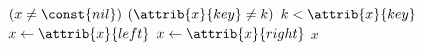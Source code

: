 \begin{codebox}
\li \While $(x \neq \const{nil})$ \Or $(\attrib{x}{key} \neq k)$
\li \Do
		\If $k < \attrib{x}{key}$
\li 	\Then
			$x \gets \attrib{x}{left}$
\li 	\Else
\li			$x \gets \attrib{x}{right}$
		\End
	\End
\li \Return $x$
\end{codebox}